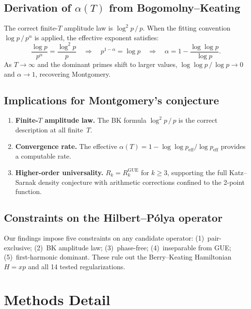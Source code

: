 \documentclass[11pt,a4paper]{article}
\begin{document}
\subsection{Derivation of $\alpha(T)$ from Bogomolny--Keating}

The correct finite-$T$ amplitude law is $\log^2 p\,/\,p$.
When the fitting convention $\log p\,/\,p^\alpha$ is applied, the effective exponent satisfies:
\begin{equation}\label{eq:alpha}
\frac{\log p}{p^\alpha} = \frac{\log^2 p}{p} \quad\Longrightarrow\quad p^{1-\alpha} = \log p \quad\Longrightarrow\quad \alpha = 1 - \frac{\log\log p}{\log p}.
\end{equation}
As $T \to \infty$ and the dominant primes shift to larger values, $\log\log p\,/\,\log p \to 0$ and $\alpha \to 1$, recovering Montgomery.

\subsection{Implications for Montgomery's conjecture}

\begin{enumerate}[nosep]
\item \textbf{Finite-$T$ amplitude law.} The BK formula $\log^2 p\,/\,p$ is the correct description at all finite~$T$.
\item \textbf{Convergence rate.} The effective $\alpha(T) = 1 - \log\log p_{\mathrm{eff}} / \log p_{\mathrm{eff}}$ provides a computable rate.
\item \textbf{Higher-order universality.} $R_k = R_k^{\mathrm{GUE}}$ for $k \ge 3$, supporting the full Katz--Sarnak density conjecture with arithmetic corrections confined to the 2-point function.
\end{enumerate}

\subsection{Constraints on the Hilbert--P\'olya operator}

Our findings impose five constraints on any candidate operator:
(1)~pair-exclusive; (2)~BK amplitude law; (3)~phase-free; (4)~inseparable from GUE; (5)~first-harmonic dominant.
These rule out the Berry--Keating Hamiltonian $H = xp$ and all 14 tested regularizations.

\section{Methods Detail}
\end{document}
